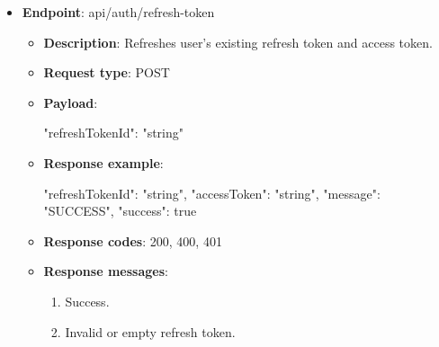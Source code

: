 \begin{itemize}
\begin{itemize}
        \item \textbf{Response codes}: 200, 400

        \item \textbf{Response messages}:
        \begin{enumerate}
            \item Success.
            \item Invalid or expired.
            \item Phone already verified
        \end{enumerate}
    \end{itemize}

    \item \textbf{Endpoint}: api/auth/refresh-token

    \begin{itemize}

        \item \textbf{Description}: Refreshes user's existing refresh token and access token.

        \item \textbf{Request type}: POST

        \item \textbf{Payload}:

        \begin{spverbatim}
        {
            "refreshTokenId": "string"
        }
        \end{spverbatim}


        \item \textbf{Response example}:

        \begin{spverbatim}
        {
            "refreshTokenId": "string",
            "accessToken": "string",
            "message": "SUCCESS",
            "success": true
        }
        \end{spverbatim}

        \item \textbf{Response codes}: 200, 400, 401

        \item \textbf{Response messages}:
        \begin{enumerate}
            \item Success.
            \item Invalid or empty refresh token.
        \end{enumerate}
    \end{itemize}


\end{itemize}

